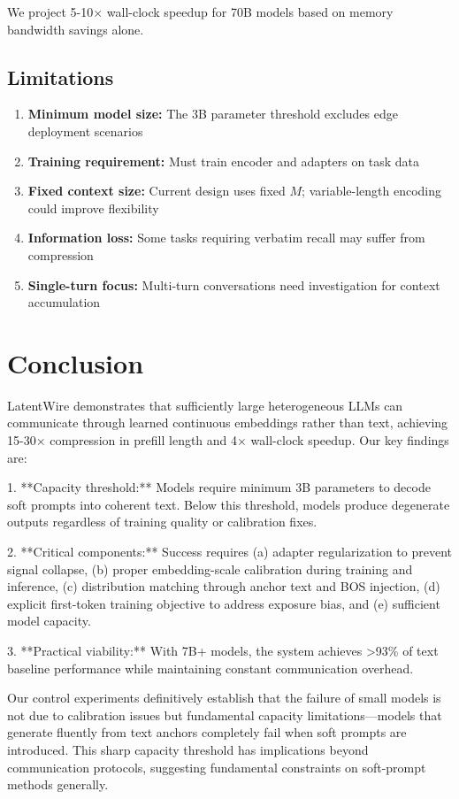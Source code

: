 \documentclass{article}
\begin{document}
We project 5-10$\times$ wall-clock speedup for 70B models based on memory bandwidth savings alone.

\subsection{Limitations}

\begin{enumerate}
\item \textbf{Minimum model size:} The 3B parameter threshold excludes edge deployment scenarios
\item \textbf{Training requirement:} Must train encoder and adapters on task data
\item \textbf{Fixed context size:} Current design uses fixed $M$; variable-length encoding could improve flexibility
\item \textbf{Information loss:} Some tasks requiring verbatim recall may suffer from compression
\item \textbf{Single-turn focus:} Multi-turn conversations need investigation for context accumulation
\end{enumerate}

\section{Conclusion}

LatentWire demonstrates that sufficiently large heterogeneous LLMs can communicate through learned continuous embeddings rather than text, achieving 15-30$\times$ compression in prefill length and 4$\times$ wall-clock speedup. Our key findings are: 

1. **Capacity threshold:** Models require minimum 3B parameters to decode soft prompts into coherent text. Below this threshold, models produce degenerate outputs regardless of training quality or calibration fixes.

2. **Critical components:** Success requires (a) adapter regularization to prevent signal collapse, (b) proper embedding-scale calibration during training and inference, (c) distribution matching through anchor text and BOS injection, (d) explicit first-token training objective to address exposure bias, and (e) sufficient model capacity.

3. **Practical viability:** With 7B+ models, the system achieves >93\% of text baseline performance while maintaining constant communication overhead.

Our control experiments definitively establish that the failure of small models is not due to calibration issues but fundamental capacity limitations—models that generate fluently from text anchors completely fail when soft prompts are introduced. This sharp capacity threshold has implications beyond communication protocols, suggesting fundamental constraints on soft-prompt methods generally.
\end{document}
